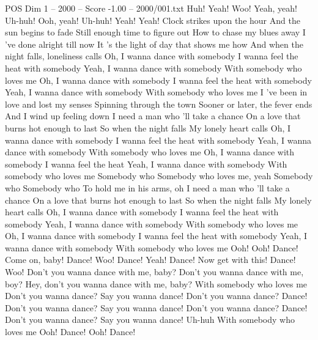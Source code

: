 \begin{textsample}{POS Dim 1 – 2000 – Score -1.00 – 2000/001.txt}  \label{ex:f1_pos_037}
Huh!
Yeah!
Woo!
Yeah, yeah!
Uh-huh!
Ooh, yeah!
Uh-huh!
Yeah!
Yeah!
Clock strikes upon the hour And the sun begins to fade Still enough time to figure out How to chase my blues away I 've done alright till now It 's the light of day that shows me how And when the night falls, loneliness calls Oh, I wanna dance with somebody I wanna feel the heat with somebody Yeah, I wanna dance with somebody With somebody who loves me Oh, I wanna dance with somebody I wanna feel the heat with somebody Yeah, I wanna dance with somebody With somebody who loves me I 've been in love and lost my senses Spinning through the town Sooner or later, the fever ends And I wind up feeling down I need a man who 'll take a chance On a love that burns hot enough to last So when the night falls My lonely heart calls Oh, I wanna dance with somebody I wanna feel the heat with somebody Yeah, I wanna dance with somebody With somebody who loves me Oh, I wanna dance with somebody I wanna feel the heat Yeah, I wanna dance with somebody With somebody who loves me Somebody who Somebody who loves me, yeah Somebody who Somebody who To hold me in his arms, oh I need a man who 'll take a chance On a love that burns hot enough to last So when the night falls My lonely heart calls Oh, I wanna dance with somebody I wanna feel the heat with somebody Yeah, I wanna dance with somebody With somebody who loves me Oh, I wanna dance with somebody I wanna feel the heat with somebody Yeah, I wanna dance with somebody With somebody who loves me Ooh!
Ooh!
Dance!
Come on, baby!
Dance!
Woo!
Dance!
Yeah!
Dance!
Now get with this!
Dance!
Woo!
Don't you wanna dance with me, baby?
Don't you wanna dance with me, boy?
Hey, don't you wanna dance with me, baby?
With somebody who loves me Don't you wanna dance?
Say you wanna dance!
Don't you wanna dance?
Dance!
Don't you wanna dance?
Say you wanna dance!
Don't you wanna dance?
Dance!
Don't you wanna dance?
Say you wanna dance!
Uh-huh With somebody who loves me Ooh!
Dance!
Ooh!
Dance!

\end{textsample}
